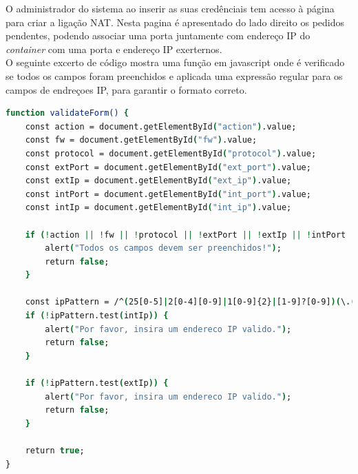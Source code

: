 O administrador do sistema ao inserir as suas credênciais tem acesso à página
para criar a ligação NAT. Nesta pagina é apresentado do lado direito
os pedidos pendentes, podendo associar uma porta juntamente com 
endereço IP do \textit{container} com uma porta e endereço IP exerternos. \\

O seguinte excerto de código mostra uma função em javascript onde é verificado
se todos os campos foram preenchidos e aplicada uma 
expressão regular para os campos de endreçoes IP, para garantir o formato correto.

\begin{lstlisting}[language=csh, caption={Código em javascript par verificar parâmetros da interface web}]
function validateForm() {
    const action = document.getElementById("action").value;
    const fw = document.getElementById("fw").value;
    const protocol = document.getElementById("protocol").value;
    const extPort = document.getElementById("ext_port").value;
    const extIp = document.getElementById("ext_ip").value;
    const intPort = document.getElementById("int_port").value;
    const intIp = document.getElementById("int_ip").value;

    if (!action || !fw || !protocol || !extPort || !extIp || !intPort || !intIp) {
        alert("Todos os campos devem ser preenchidos!");
        return false;
    }

    const ipPattern = /^(25[0-5]|2[0-4][0-9]|1[0-9]{2}|[1-9]?[0-9])(\.(25[0-5]|2[0-4][0-9]|1[0-9]{2}|[1-9]?[0-9])){3}$/;
    if (!ipPattern.test(intIp)) {
        alert("Por favor, insira um endereco IP valido.");
        return false;
    }

    if (!ipPattern.test(extIp)) {
        alert("Por favor, insira um endereco IP valido.");
        return false;
    }

    return true;
}
\end{lstlisting}




